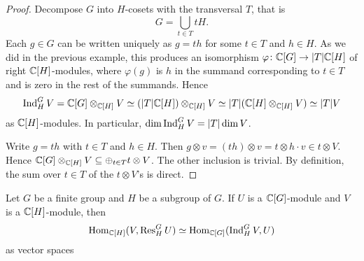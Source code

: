 \begin{proof}
Decompose $G$ into $H$-cosets with the transversal 
$T$, that is 
\[
G=\bigcup_{t\in T}tH.
\]
Each $g\in G$ can be written uniquely as $g=th$ for some $t\in T$ and $h\in H$. As we did in the previous example, this 
produces an isomorphism 
$\varphi\colon \mathbb{C}[G]\to |T|\mathbb{C}[H]$ of right $\mathbb{C}[H]$-modules, where $\varphi(g)$ is $h$ in the summand corresponding to $t\in T$
and is zero in the rest of the summands. Hence 
\[
\operatorname{Ind}_H^GV=\mathbb{C}[G]\otimes_{\mathbb{C}[H]}V\simeq (|T|\mathbb{C}[H])\otimes_{\mathbb{C}[H]}V\simeq |T|(\mathbb{C}[H]\otimes_{\mathbb{C}[H]}V)\simeq |T|V
\]
as $\mathbb{C}[H]$-modules. In particular, $\dim\operatorname{Ind}_H^GV=|T|\dim V$. 

 Write $g=th$ with $t\in T$ and $h\in H$. Then $g\otimes v=(th)\otimes v=t\otimes h\cdot v\in t\otimes V$. 
Hence $\mathbb{C}[G]\otimes_{\mathbb{C}[H]}V\subseteq \oplus_{t\in T}t\otimes V$. The other inclusion is trivial. By definition, 
the sum over $t\in T$ of the $t\otimes V$'s is direct.
\end{proof}

\begin{theorem}
Let $G$ be a finite group and $H$ be a subgroup of $G$. 
If $U$ is a $\mathbb{C}[G]$-module and $V$ is a $\mathbb{C}[H]$-module, then
\[
\operatorname{Hom}_{\mathbb{C}[H]}(V,\operatorname{Res}_H^GU)\simeq \operatorname{Hom}_{\mathbb{C}[G]}(\operatorname{Ind}_H^GV,U)
\]
as vector spaces
\end{theorem}

